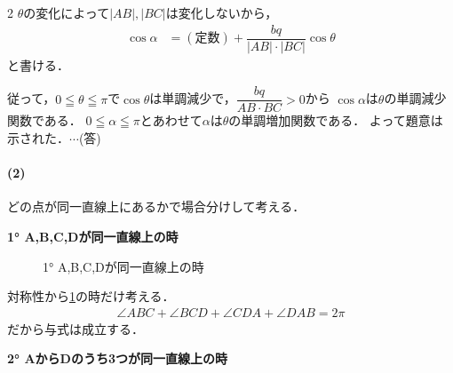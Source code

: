 \documentclass[../../main.tex]{subfiles}
\begin{document}
\begin{multicols}{2}
  $\theta$の変化によって$|AB|, |BC|$は変化しないから，
  \begin{align}
    \cos\alpha
    & = (\text{定数})  + \dfrac{bq}{|AB| \cdot |BC|} \cos\theta
  \end{align}
  と書ける．

  従って，$0 \leqq \theta \leqq \pi$で$\cos\theta$は単調減少で，$\dfrac{bq}{AB \cdot BC} > 0$から
  $\cos\alpha$は$\theta$の単調減少関数である．
  $0 \leqq \alpha \leqq \pi$とあわせて$\alpha$は$\theta$の単調増加関数である．
  よって題意は示された．$\cdots$(答)

  \paragraph{(2)}

  どの点が同一直線上にあるかで場合分けして考える．

  \textbf{1° A,B,C,Dが同一直線上の時}

  \begin{figure}[H]
    \centering
    \caption{1° A,B,C,Dが同一直線上の時}
    \label{1992-2:fig:2}
  \end{figure}

  対称性から\cref{1992-2:fig:2}の時だけ考える．
  \begin{align}
    \angle ABC + \angle BCD + \angle CDA + \angle DAB = 2\pi
  \end{align}
  だから与式は成立する．

  \textbf{2° AからDのうち3つが同一直線上の時}


\end{multicols}
\end{document}
